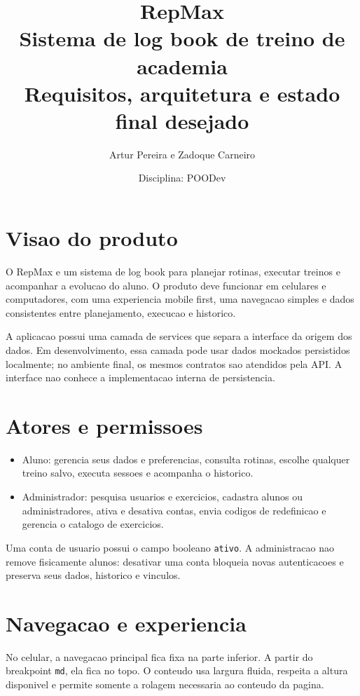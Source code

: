 \documentclass[12pt,a4paper]{article}
\title{\textbf{RepMax}\\[0.2cm]
\Large Sistema de log book de treino de academia\\[0.2cm]
\large Requisitos, arquitetura e estado final desejado}
\author{Artur Pereira e Zadoque Carneiro}
\date{Disciplina: POODev}
\begin{document}
\maketitle
\tableofcontents
\newpage

\section{Visao do produto}

O RepMax e um sistema de log book para planejar rotinas, executar treinos e acompanhar a evolucao do aluno. O produto deve funcionar em celulares e computadores, com uma experiencia mobile first, uma navegacao simples e dados consistentes entre planejamento, execucao e historico.

A aplicacao possui uma camada de services que separa a interface da origem dos dados. Em desenvolvimento, essa camada pode usar dados mockados persistidos localmente; no ambiente final, os mesmos contratos sao atendidos pela API. A interface nao conhece a implementacao interna de persistencia.

\section{Atores e permissoes}

\begin{itemize}[leftmargin=*]
    \item Aluno: gerencia seus dados e preferencias, consulta rotinas, escolhe qualquer treino salvo, executa sessoes e acompanha o historico.
    \item Administrador: pesquisa usuarios e exercicios, cadastra alunos ou administradores, ativa e desativa contas, envia codigos de redefinicao e gerencia o catalogo de exercicios.
\end{itemize}

Uma conta de usuario possui o campo booleano \texttt{ativo}. A administracao nao remove fisicamente alunos: desativar uma conta bloqueia novas autenticacoes e preserva seus dados, historico e vinculos.

\section{Navegacao e experiencia}

No celular, a navegacao principal fica fixa na parte inferior. A partir do breakpoint \texttt{md}, ela fica no topo. O conteudo usa largura fluida, respeita a altura disponivel e permite somente a rolagem necessaria ao conteudo da pagina.
\end{document}
